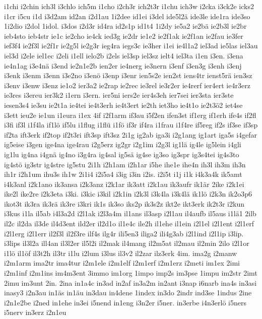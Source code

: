 {i1chi
i2chin
ich3l
i3chlo
ich5m
i1cho
i2ch3r
ich2t3r
i1chu
ich3w
i2cka
i3ck2e
icks2
i1cr
i5cu
i1d
i3d2am
id2an
i2d1au
1i2dee
id1ei
i3del
ide5l2ä
ide3le
ide1ra
ide3so
1i2dio
i2dol
1idol.
i3dos
i2d3r
id4ra
id2s1p
id1t4
1i2dy
ie5a2
ie2bä
ie2b3l
ie2br
ieb4sto
ieb4str
ie1c
ie2cho
ie4ck
ied3g
ie2dr
ie1e2
ie2f1ak
ie2f1an
ie2fau
ie3fer
ief3f4
ie2f3l
ie2f1r
ie2g5l
ie2g3r
ieg4ra
iegs3c
ie3her
i1ei
ie4l1a2
iel3ad
ie5las
iel3au
iel3d
i2ele
iel1ec
i2eli
i1ell
ielo2b
i2els
iel3sp
iel3sz
ielt4
iel3ta
i1en
i3en.
i3ena
ie4n1ag
i3e4nä
i3end
ie2n1e2b
ien2er
ie4nerg
ie3nern
i3enf
i3en3g
i3enh
i3enj
i3enk
i3enm
i3enn
i3e2no
i3enö
i3enp
i3enr
ien5s2e
ien2st
iens4tr
ienst5rä
ien3sz
i3env
i3enw
i3enz
ie1o2
ier3a2
ie2rap
ie2rec
ie3rel
ie3r2er
ie4rerf
ier4ert
ie4r3erz
ie3res
i3ereu
ier3k2
i1ern
i3ern.
ier5ni
iers2e
ier4s3eh
ier7sei
ier3sta
ier3ste
iesen3s4
ie3su
ie2t1a
ie4tei
ie4t3erh
ie4t3ert
ie2th
iet3ho
ie4t1o
ie2t3ö2
iet4se
i3ett
ieu2e
ie1un
i1eura
i1ex
4if
i2f1arm
if3au
i5f2en
ifen3st
if1erg
if1erh
ife4s
if2fl
i3fi
if3l
i1f4la
if1lö
if5lu
i1flug
i1flü
i1fö
if3r
if4ra
i1frau
i1f4re
if5reg
if2s
if3se
if3sp
if2ta
ift3erk
if2top
if2t3ri
ift3sp
ift3sz
2i1g
ig2ab
iga3i
i2g1ang
ig1art
iga5s
i4gefar
ig5eise
i3gen
ige4na
ige4rau
i2g5erz
ig2gr
i2g1im
i2g3l
ig1lä
ig4le
ig5lein
i4gli
ig1lu
ig4na
i4gnä
ig4no
i3g4ra
ig4sal
ig5sä
ig4se
ig3so
ig3spr
ig3s4tei
ig4s3to
ig4stö
ig3str
ig4stre
ig5stu
2i1h
i2h1am
i2h1ar
i5he
ihe1e
ihe4n
ih3l
ih3m
ih3n
ih1r
i2h1um
ihu3s
ih1w
2i1i4
i2i5a4
i3ig
i3in
i2is.
i2i5t
i1j
i1k
i4k3a4k
ik5amt
i4k3anl
i2k1ano
ik3ansa
i2k3anz
i2k1ar
ik3att
i2k1au
ik3aufr
ik1är
2ike
i2k1ei
ike2l
ike2re
i2k3eta
i3ki.
i3kic
i3kil
i2k1in
i2k3l
i3k4la
i3k4lä
ik1lö
i2k3n
ik2o3p6
ikot3t
ik3ra
ik3rä
ik3re
i3kri
ik1s
ik3so
iks2p
ik3s2z
ikt2e
ikt3erk
ik2t3r
i2kun
i3kus
i1la
il5ab
i4l3a2d
i2l1ak
i2l3a4m
il1ans
il3asp
i2l1au
il4aufb
il5aus
i1lä1
2ilb
il2c
il2da
il3de
il4d3ent
ild2er
il2d1o
il1e4c
ile2h
il1ehe
il1ein
i2l1el
i2l1ent
i2l1erf
i2l1erg
i2l1err
il2f3l
il2f3re
ilf4s
ilg4r
ili5en3
iliga2
ili4g3ab
i2l1ind
i2l1ip
i3lip.
i3lips
il3l2a
ill4an
il3l2er
il5l2i
il2mak
il4mang
il2m5at
il2mau
il2min
2ilo
i2l1or
i1lö
il1öf
il3t2h
il3tr
i1lu
i2lum
i3lus
il3v2
il2zar
ilz3erk
4im.
ima2g
i2manw
i2m1arm
ima2tr
ima4tur
i2m1ele
i2m1elf
i2m1erf
i2m1erz
i2meti
im1ex
2imi
i2m1inf
i2m1ins
im4m3ent
3immo
im1org
1impo
imp2s
im3pse
1impu
im2str
2imt
2imu
im3unt
2in.
2ina
in1a4c
in3ad
in2af
in3a2m
in2ant
i3nap
i6narb
ina4s
in3asi
inasy3
i2n3au
in1äs
in1äu
in3dau
in4dene
1index
in3do
2indr
ind3se
1indus
2ine
i2n1e2be
i2ned
in1ehe
in3ei
i5nend
in1eng
i3n2er
i5ner.
in3erbe
i4n3erlö
i5ners
i5nerv
in3erz
i2n1eu
}
